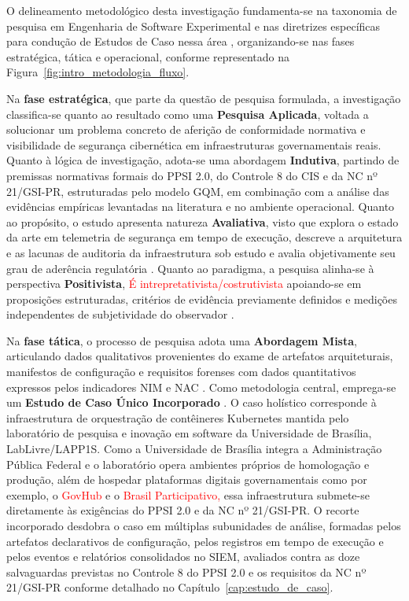 O delineamento metodológico desta investigação fundamenta-se na taxonomia de pesquisa em Engenharia de Software Experimental \cite{wohlin2024} e nas diretrizes específicas para condução de Estudos de Caso nessa área \cite{runeson2009,yin2015}, organizando-se nas fases estratégica, tática e operacional, conforme representado na Figura~\ref{fig:intro_metodologia_fluxo}.

Na \textbf{fase estratégica}, que parte da questão de pesquisa formulada, a investigação classifica-se quanto ao resultado como uma \textbf{Pesquisa Aplicada}, voltada a solucionar um problema concreto de aferição de conformidade normativa e visibilidade de segurança cibernética em infraestruturas governamentais reais. Quanto à lógica de investigação, adota-se uma abordagem \textbf{Indutiva}, partindo  de premissas normativas formais do PPSI 2.0, do Controle 8 do CIS e da NC nº 21/GSI-PR, estruturadas pelo modelo GQM, em combinação com a análise das evidências empíricas levantadas na literatura e no ambiente operacional. Quanto ao propósito, o estudo apresenta natureza \textbf{ Avaliativa}, visto que explora o estado da arte em telemetria de segurança em tempo de execução, descreve a arquitetura e as lacunas de auditoria da infraestrutura sob estudo e avalia objetivamente seu grau de aderência regulatória \cite{wohlin2024,runeson2009}. Quanto ao paradigma, a pesquisa alinha-se à perspectiva \textbf{Positivista}, \textcolor{red}{É intrepretativista/costrutivista}  apoiando-se em proposições estruturadas, critérios de evidência previamente definidos e medições independentes de subjetividade do observador \cite{runeson2009}. 

Na \textbf{fase tática}, o processo de pesquisa adota uma \textbf{Abordagem Mista}, articulando dados qualitativos provenientes do exame de artefatos arquiteturais, manifestos de configuração e requisitos forenses com dados quantitativos expressos pelos indicadores NIM e NAC \cite{runeson2009}. Como metodologia central, emprega-se um \textbf{Estudo de Caso Único Incorporado} \cite{runeson2009,yin2015}. O caso holístico corresponde à infraestrutura de orquestração de contêineres Kubernetes mantida pelo laboratório de pesquisa e inovação em software da Universidade de Brasília, LabLivre/LAPP1S. Como a Universidade de Brasília integra a Administração Pública Federal e o laboratório opera ambientes próprios de homologação e produção, além de hospedar plataformas digitais governamentais como por exemplo, o \textcolor{red}{GovHub}   e o   \textcolor{red}{Brasil Participativo,}  essa infraestrutura submete-se diretamente às exigências do PPSI 2.0 e da NC nº 21/GSI-PR. O recorte incorporado desdobra o caso em múltiplas subunidades de análise, formadas pelos artefatos declarativos de configuração, pelos registros em tempo de execução e pelos eventos e relatórios consolidados no SIEM, avaliados contra as doze salvaguardas previstas no Controle 8 do PPSI 2.0 e os requisitos da NC nº 21/GSI-PR conforme detalhado no Capítulo~\ref{cap:estudo_de_caso}.

